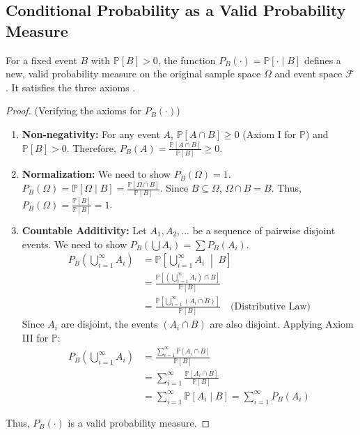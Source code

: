 \documentclass[12pt, a4paper]{article}
\theoremstyle{definition}
\theoremstyle{plain}
\theoremstyle{remark}
\begin{document}
\subsection{Conditional Probability as a Valid Probability Measure}

For a fixed event $B$ with $\mathbb{P}[B] > 0$, the function $P_B(\cdot) = \mathbb{P}[\cdot \mid B]$ defines a new, valid probability measure on the original sample space $\Omega$ and event space $\mathcal{F}$. It satisfies the three axioms \cite{faculty_prob}.

\begin{proof} (Verifying the axioms for $P_B(\cdot)$)
\begin{enumerate}
    \item \textbf{Non-negativity:} For any event $A$, $\mathbb{P}[A \cap B] \ge 0$ (Axiom I for $\mathbb{P}$) and $\mathbb{P}[B] > 0$. Therefore, $P_B(A) = \frac{\mathbb{P}[A \cap B]}{\mathbb{P}[B]} \ge 0$.
    
    \item \textbf{Normalization:} We need to show $P_B(\Omega) = 1$.
    $P_B(\Omega) = \mathbb{P}[\Omega \mid B] = \frac{\mathbb{P}[\Omega \cap B]}{\mathbb{P}[B]}$. Since $B \subseteq \Omega$, $\Omega \cap B = B$. Thus, $P_B(\Omega) = \frac{\mathbb{P}[B]}{\mathbb{P}[B]} = 1$.
    
    \item \textbf{Countable Additivity:} Let $A_1, A_2, ...$ be a sequence of pairwise disjoint events. We need to show $P_B(\bigcup A_i) = \sum P_B(A_i)$.
    \begin{align*}
        P_B\left(\bigcup_{i=1}^{\infty} A_i\right) &= \mathbb{P}\left[\bigcup_{i=1}^{\infty} A_i \;\middle|\; B\right] \\
        &= \frac{\mathbb{P}\left[\left(\bigcup_{i=1}^{\infty} A_i\right) \cap B\right]}{\mathbb{P}[B]} \\
        &= \frac{\mathbb{P}\left[\bigcup_{i=1}^{\infty} (A_i \cap B)\right]}{\mathbb{P}[B]} \quad \text{(Distributive Law)}
    \end{align*}
    Since $A_i$ are disjoint, the events $(A_i \cap B)$ are also disjoint. Applying Axiom III for $\mathbb{P}$:
    \begin{align*}
        P_B\left(\bigcup_{i=1}^{\infty} A_i\right) &= \frac{\sum_{i=1}^{\infty} \mathbb{P}[A_i \cap B]}{\mathbb{P}[B]} \\
        &= \sum_{i=1}^{\infty} \frac{\mathbb{P}[A_i \cap B]}{\mathbb{P}[B]} \\
        &= \sum_{i=1}^{\infty} \mathbb{P}[A_i \mid B] = \sum_{i=1}^{\infty} P_B(A_i)
    \end{align*}
\end{enumerate}
Thus, $P_B(\cdot)$ is a valid probability measure.
\end{proof}

\newpage
\end{document}
